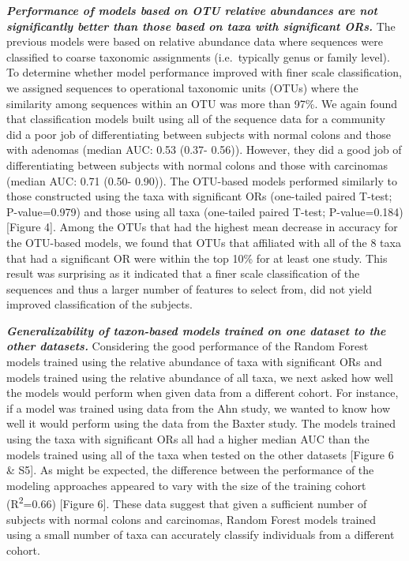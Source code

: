 \documentclass[12pt,]{article}
\begin{document}
\textbf{\emph{Performance of models based on OTU relative abundances are
not significantly better than those based on taxa with significant
ORs.}} The previous models were based on relative abundance data where
sequences were classified to coarse taxonomic assignments
(i.e.~typically genus or family level). To determine whether model
performance improved with finer scale classification, we assigned
sequences to operational taxonomic units (OTUs) where the similarity
among sequences within an OTU was more than 97\%. We again found that
classification models built using all of the sequence data for a
community did a poor job of differentiating between subjects with normal
colons and those with adenomas (median AUC: 0.53 (0.37- 0.56)). However,
they did a good job of differentiating between subjects with normal
colons and those with carcinomas (median AUC: 0.71 (0.50- 0.90)). The
OTU-based models performed similarly to those constructed using the taxa
with significant ORs (one-tailed paired T-test; P-value=0.979) and those
using all taxa (one-tailed paired T-test; P-value=0.184) {[}Figure 4{]}.
Among the OTUs that had the highest mean decrease in accuracy for the
OTU-based models, we found that OTUs that affiliated with all of the 8
taxa that had a significant OR were within the top 10\% for at least one
study. This result was surprising as it indicated that a finer scale
classification of the sequences and thus a larger number of features to
select from, did not yield improved classification of the subjects.

\textbf{\emph{Generalizability of taxon-based models trained on one
dataset to the other datasets.}} Considering the good performance of the
Random Forest models trained using the relative abundance of taxa with
significant ORs and models trained using the relative abundance of all
taxa, we next asked how well the models would perform when given data
from a different cohort. For instance, if a model was trained using data
from the Ahn study, we wanted to know how well it would perform using
the data from the Baxter study. The models trained using the taxa with
significant ORs all had a higher median AUC than the models trained
using all of the taxa when tested on the other datasets {[}Figure 6 \&
S5{]}. As might be expected, the difference between the performance of
the modeling approaches appeared to vary with the size of the training
cohort (R\textsuperscript{2}=0.66) {[}Figure 6{]}. These data suggest
that given a sufficient number of subjects with normal colons and
carcinomas, Random Forest models trained using a small number of taxa
can accurately classify individuals from a different cohort.
\end{document}
